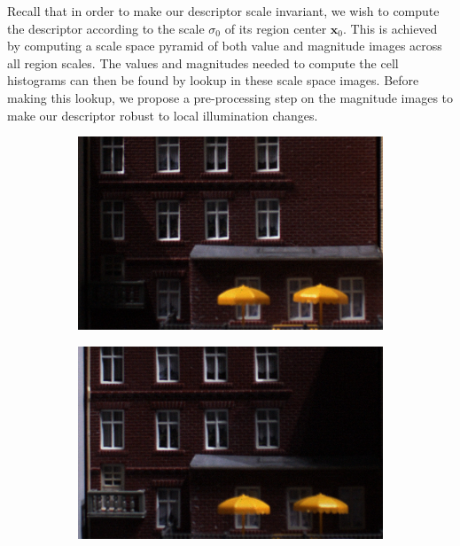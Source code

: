 \documentclass[thesis.tex]{subfiles}
\def\x{\mathbf{x}}
\begin{document}
Recall that in order to make our descriptor scale invariant, we wish to compute the descriptor according to the scale $\sigma_0$ of its region center $\x_0$. This is achieved by computing a scale space pyramid of both value and magnitude images across all region scales. The values and magnitudes needed to compute the cell histograms can then be found by lookup in these scale space images. Before making this lookup, we propose a pre-processing step on the magnitude images to make our descriptor robust to local illumination changes.
%
\begin{figure}[p]
    \centering
    \begin{subfigure}[t]{0.48\textwidth}
        \includegraphics[width=\textwidth]{img/pixelNormalizationExample1.png}
        \caption{}
        \label{fig:pixelNormalizationExample1}
    \end{subfigure}
    \begin{subfigure}[t]{0.48\textwidth}
        \includegraphics[width=\textwidth]{img/pixelNormalizationExample2.png}

\end{subfigure}
\end{figure}
\end{document}
